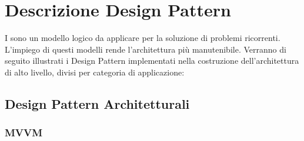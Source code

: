 \section{Descrizione Design Pattern }
I  sono un modello logico da applicare per la soluzione di problemi
ricorrenti. L’impiego di questi modelli rende l'architettura più manutenibile. Verranno
di seguito illustrati i Design Pattern implementati nella costruzione dell’architettura di
alto livello, divisi per categoria di applicazione:
	\subsection{Design Pattern Architetturali}
	
		\subsubsection{MVVM}
